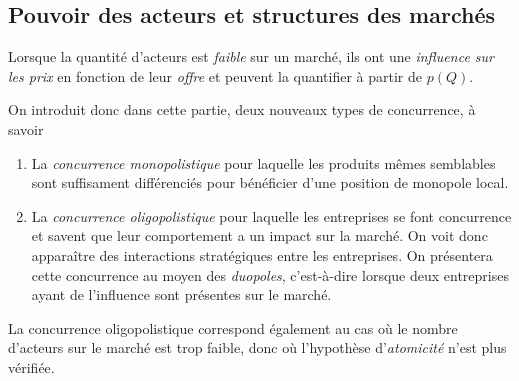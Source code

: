 

\subsection{Pouvoir des acteurs et structures des marchés} %
\label{sec:pouvoir_des_acteurs_et_structures_des_marches}

Lorsque la quantité d'acteurs est \emph{faible} sur un marché, 
ils ont une \emph{influence sur les prix} en fonction de leur \emph{offre} 
et peuvent la quantifier à partir de $p(Q)$. 

On introduit donc dans cette partie, deux nouveaux types de concurrence, à savoir
\begin{enumerate}
  \item La \emph{concurrence monopolistique} pour laquelle les produits mêmes semblables 
  sont suffisament différenciés pour bénéficier d'une position de monopole local. 
  \item La \emph{concurrence oligopolistique} pour laquelle les entreprises se font concurrence
  et savent que leur comportement a un impact sur la marché.
  On voit donc apparaître des interactions stratégiques entre les entreprises.
  On présentera cette concurrence au moyen des \emph{duopoles}, c'est-à-dire lorsque deux entreprises
  ayant de l'influence sont présentes sur le marché.
\end{enumerate}

La concurrence oligopolistique correspond également au cas où le nombre d'acteurs
sur le marché est trop faible, donc où l'hypothèse d'\emph{atomicité} n'est plus vérifiée.

